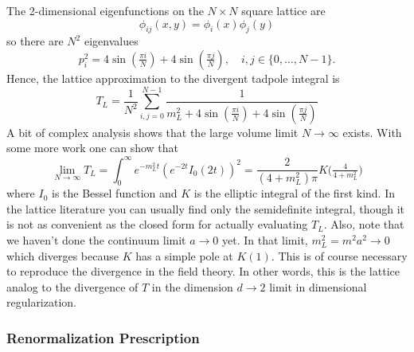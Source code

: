 \documentclass[12pt]{article}
\begin{document}
The 2-dimensional eigenfunctions on the $N\times N$ square lattice are
\begin{equation}
  \phi_{ij}(x,y) = \phi_i(x) \phi_j(y)
\end{equation}
so there are $N^2$ eigenvalues
\begin{equation}
  p^2_{i} = 
  4 \sin\left(\tfrac{\pi i}{N}\right) + 
  4 \sin\left(\tfrac{\pi j}{N}\right)
  ,\quad
  i, j \in \{0, \dots, N-1\}.
\end{equation}
Hence, the lattice approximation to the divergent tadpole integral is
\begin{equation}
  T_L = \frac{1}{N^2}
  \sum_{i,j = 0}^{N-1}
  \frac{1}{
    m_L^2 + 
    4 \sin\left(\tfrac{\pi i}{N}\right) + 
    4 \sin\left(\tfrac{\pi j}{N}\right)
  }
\end{equation}
A bit of complex analysis shows that the large volume limit $N\to
\infty$ exists. With some more work one can show that
\begin{equation}
  \lim_{N\to \infty} T_L = 
  \int_0^\infty e^{-m_L^2 t}
  \left(
    e^{-2t} I_0(2t)
  \right)^2 = 
  \frac{2}{(4+m_L^2)\pi} 
  K\big(\tfrac{4}{4+m_L^2}\big)
\end{equation}
where $I_0$ is the Bessel function and $K$ is the elliptic integral of
the first kind. In the lattice literature you can usually find only
the semidefinite integral, though it is not as convenient as the
closed form for actually evaluating $T_L$. Also, note that we haven't
done the continuum limit $a\to 0$ yet. In that limit, $m_L^2 = m^2 a^2
\to 0$ which diverges because $K$ has a simple pole at $K(1)$. This is
of course necessary to reproduce the divergence in the field
theory. In other words, this is the lattice analog to the divergence
of $T$ in the dimension $d\to 2$ limit in dimensional regularization.


\subsubsection{Renormalization Prescription}
\end{document}
